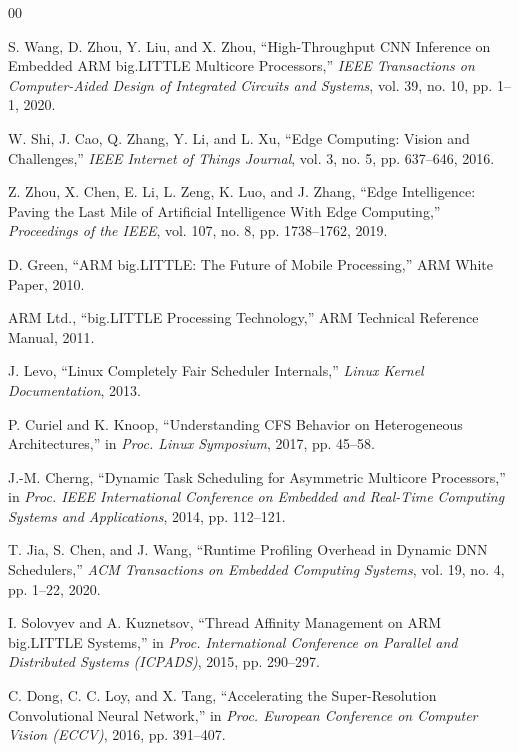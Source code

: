 \documentclass[conference]{IEEEtran}
\begin{document}
\begin{thebibliography}{00}

S. Wang, D. Zhou, Y. Liu, and X. Zhou, ``High-Throughput CNN Inference on Embedded ARM big.LITTLE Multicore Processors,'' \textit{IEEE Transactions on Computer-Aided Design of Integrated Circuits and Systems}, vol. 39, no. 10, pp. 1--1, 2020.

W. Shi, J. Cao, Q. Zhang, Y. Li, and L. Xu, ``Edge Computing: Vision and Challenges,'' \textit{IEEE Internet of Things Journal}, vol. 3, no. 5, pp. 637--646, 2016.

Z. Zhou, X. Chen, E. Li, L. Zeng, K. Luo, and J. Zhang, ``Edge Intelligence: Paving the Last Mile of Artificial Intelligence With Edge Computing,'' \textit{Proceedings of the IEEE}, vol. 107, no. 8, pp. 1738--1762, 2019.

D. Green, ``ARM big.LITTLE: The Future of Mobile Processing,'' ARM White Paper, 2010.

ARM Ltd., ``big.LITTLE Processing Technology,'' ARM Technical Reference Manual, 2011.

J. Levo, ``Linux Completely Fair Scheduler Internals,'' \textit{Linux Kernel Documentation}, 2013.

P. Curiel and K. Knoop, ``Understanding CFS Behavior on Heterogeneous Architectures,'' in \textit{Proc. Linux Symposium}, 2017, pp. 45--58.

J.-M. Cherng, ``Dynamic Task Scheduling for Asymmetric Multicore Processors,'' in \textit{Proc. IEEE International Conference on Embedded and Real-Time Computing Systems and Applications}, 2014, pp. 112--121.

T. Jia, S. Chen, and J. Wang, ``Runtime Profiling Overhead in Dynamic DNN Schedulers,'' \textit{ACM Transactions on Embedded Computing Systems}, vol. 19, no. 4, pp. 1--22, 2020.

I. Solovyev and A. Kuznetsov, ``Thread Affinity Management on ARM big.LITTLE Systems,'' in \textit{Proc. International Conference on Parallel and Distributed Systems (ICPADS)}, 2015, pp. 290--297.

C. Dong, C. C. Loy, and X. Tang, ``Accelerating the Super-Resolution Convolutional Neural Network,'' in \textit{Proc. European Conference on Computer Vision (ECCV)}, 2016, pp. 391--407.


\end{thebibliography}
\end{document}
